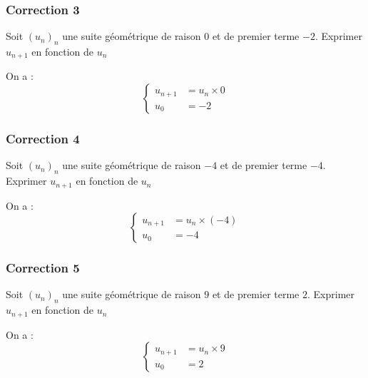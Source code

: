 \documentclass[15pt, mathserif]{beamer}
\begin{document}
\begin{frame}
\vspace{-10mm}
	\frametitle{Correction 3}
Soit $(u_n)_n$ une suite géométrique de raison $0$ et de premier terme $-2$. Exprimer $u_{n+1}$ en fonction de $u_n$ 
 
 On a : $$ \left\{ 
 \begin{array}{ll} 
 u_{n+1} &= u_n \times 0 \\ 
 u_0 & = -2 
 \end{array} 
 \right. $$ 
 \end{frame}


\begin{frame}
\vspace{-10mm}
	\frametitle{Correction 4}
Soit $(u_n)_n$ une suite géométrique de raison $-4$ et de premier terme $-4$. Exprimer $u_{n+1}$ en fonction de $u_n$ 
 
 On a : $$ \left\{ 
 \begin{array}{ll} 
 u_{n+1} &= u_n \times \left(-4\right) \\ 
 u_0 & = -4 
 \end{array} 
 \right. $$ 
 \end{frame}


\begin{frame}
\vspace{-10mm}
	\frametitle{Correction 5}
Soit $(u_n)_n$ une suite géométrique de raison $9$ et de premier terme $2$. Exprimer $u_{n+1}$ en fonction de $u_n$ 
 
 On a : $$ \left\{ 
 \begin{array}{ll} 
 u_{n+1} &= u_n \times 9 \\ 
 u_0 & = 2 
 \end{array} 
 \right. $$ 
 \end{frame}
\end{document}
